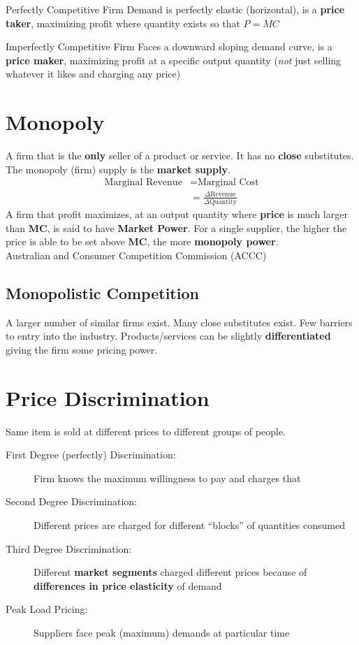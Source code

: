 \begin{note}{Perfectly Competitive Firm}
	Demand is perfectly elastic (horizontal), is a \textbf{price taker}, maximizing profit where quantity exists so that $P=MC$
\end{note}
\newpage
\begin{note}{Imperfectly Competitive Firm}
	Faces a downward sloping demand curve, is a \textbf{price maker}, maximizing profit at a specific output quantity (\textit{not} just selling whatever it likes and charging any price)
\end{note}

\section{Monopoly}
A firm that is the \textbf{only} seller of a product or service. It has no \textbf{close} substitutes. The monopoly (firm) supply is the \textbf{market supply}.
\begin{align*}
	\text{Marginal Revenue} &= \text{Marginal Cost}\\
	&= \frac{\Delta\text{Revenue}}{\Delta\text{Quantity}}
\end{align*}
A firm that profit maximizes, at an output quantity where \textbf{price} is much larger than \textbf{MC}, is said to have \textbf{Market Power}. For a single supplier, the higher the price is able to be set above \textbf{MC}, the more \textbf{monopoly power}.\\

Australian and Consumer Competition Commission (ACCC)

\subsection{Monopolistic Competition}
A larger number of similar firms exist. Many close substitutes exist. Few barriers to entry into the industry. Products/services can be slightly \textbf{differentiated} giving the firm some pricing power.

\section{Price Discrimination}
Same item is sold at different prices to different groups of people.
\begin{description}
	\item[First Degree (perfectly) Discrimination:] Firm knows the maximum willingness to pay and charges that
	\item[Second Degree Discrimination:] Different prices are charged for different ``blocks'' of quantities consumed
	\item[Third Degree Discrimination:] Different \textbf{market segments} charged different prices because of \textbf{differences in price elasticity} of demand
	\item[Peak Load Pricing:] Suppliers face peak (maximum) demands at particular time
\end{description}

